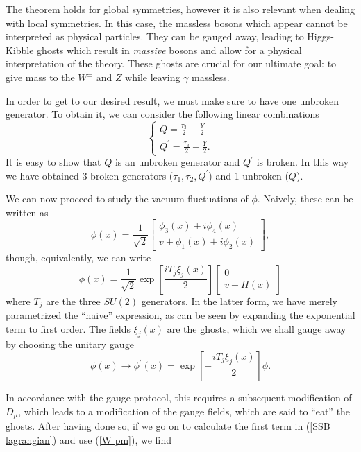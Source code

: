 \documentclass[10pt,a4paper]{book}
\begin{document}
The theorem holds for global symmetries, however it is also relevant when dealing with local symmetries. In this case, the massless bosons which appear cannot be interpreted as physical particles. They can be gauged away, leading to Higgs-Kibble ghosts which result in \emph{massive} bosons and allow for a physical interpretation of the theory. These ghosts are crucial for our ultimate goal: to give mass to the $W^\pm$ and $Z$ while leaving $\gamma$ massless.

In order to get to our desired result, we must make sure to have one unbroken generator. To obtain it, we can consider the following linear combinations
\begin{equation}
\begin{cases}
Q = \frac{\tau_3}{2} - \frac{Y}{2} \\
Q^\prime = \frac{\tau_3}{2} + \frac{Y}{2}.
\end{cases}
\end{equation}
It is easy to show that $Q$ is an unbroken generator and $Q^\prime$ is broken. In this way we have obtained 3 broken generators ($\tau_1, \tau_2, Q^\prime$) and 1 unbroken ($Q$).

We can now proceed to study the vacuum fluctuations of $\phi$. Naively, these can be written as
\begin{equation}
\phi (x) = \frac{1}{\sqrt{2}}\begin{bmatrix}
\phi_3(x) + i\phi_4(x) \\
v + \phi_1(x) + i\phi_2(x)
\end{bmatrix},
\end{equation}
though, equivalently, we can write
\begin{equation}
\phi (x) = \frac{1}{\sqrt{2}}\exp\left[\frac{iT_j\xi_j(x)}{2} \right]\begin{bmatrix}
0 \\
v + H(x)
\end{bmatrix}
\end{equation}
where $T_j$ are the three $SU(2)$ generators. In the latter form, we have merely parametrized the ``naive'' expression, as can be seen by expanding the exponential term to first order. The fields $\xi_j(x)$ are the ghosts, which we shall gauge away by choosing the unitary gauge
\begin{equation}
\phi (x) \rightarrow \phi^\prime (x) = \exp\left[-\frac{iT_j\xi_j(x)}{2} \right]\phi.
\end{equation}  

In accordance with the gauge protocol, this requires a subsequent modification of $D_\mu$, which leads to a modification of the gauge fields, which are said to ``eat'' the ghosts. After having done so, if we go on to calculate the first term in (\ref{SSB lagrangian}) and use (\ref{W pm}), we find
\end{document}
